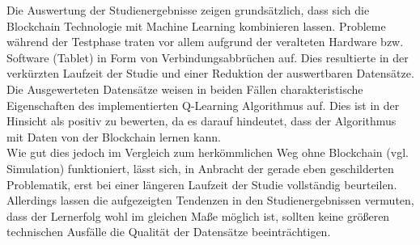 Die Auswertung der Studienergebnisse zeigen grundsätzlich, dass sich die Blockchain Technologie mit Machine Learning kombinieren lassen. Probleme während der Testphase traten vor allem aufgrund der veralteten Hardware bzw. Software (Tablet) in Form von Verbindungsabbrüchen auf. Dies resultierte in der verkürzten Laufzeit der Studie und einer Reduktion der auswertbaren Datensätze.\\ 
Die Ausgewerteten Datensätze weisen in beiden Fällen charakteristische Eigenschaften des implementierten Q-Learning Algorithmus auf. Dies ist in der Hinsicht als positiv zu bewerten, da es darauf hindeutet, dass der Algorithmus mit Daten von der Blockchain lernen kann. \\
Wie gut dies jedoch im Vergleich zum herkömmlichen Weg ohne Blockchain (vgl. Simulation) funktioniert, lässt sich, in Anbracht der gerade eben geschilderten Problematik, erst bei einer längeren Laufzeit der Studie vollständig beurteilen. Allerdings lassen die aufgezeigten Tendenzen in den Studienergebnissen vermuten, dass der Lernerfolg wohl im gleichen Maße möglich ist, sollten keine größeren technischen Ausfälle die Qualität der Datensätze beeinträchtigen. 
